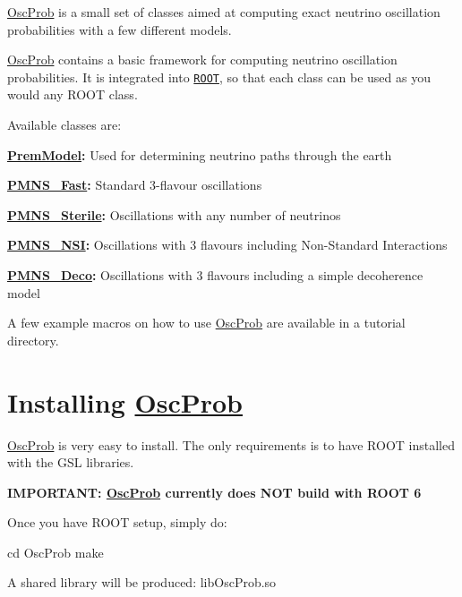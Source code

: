 \hyperlink{namespaceOscProb}{Osc\+Prob} is a small set of classes aimed at computing exact neutrino oscillation probabilities with a few different models.

\hyperlink{namespaceOscProb}{Osc\+Prob} contains a basic framework for computing neutrino oscillation probabilities. It is integrated into \href{https://root.cern.ch/}{\tt R\+O\+OT}, so that each class can be used as you would any R\+O\+OT class.

Available classes are\+:
\begin{DoxyItemize}
\item {\bfseries \hyperlink{classOscProb_1_1PremModel}{Prem\+Model}\+:} Used for determining neutrino paths through the earth
\item {\bfseries \hyperlink{classOscProb_1_1PMNS__Fast}{P\+M\+N\+S\+\_\+\+Fast}\+:} Standard 3-\/flavour oscillations
\item {\bfseries \hyperlink{classOscProb_1_1PMNS__Sterile}{P\+M\+N\+S\+\_\+\+Sterile}\+:} Oscillations with any number of neutrinos
\item {\bfseries \hyperlink{classOscProb_1_1PMNS__NSI}{P\+M\+N\+S\+\_\+\+N\+SI}\+:} Oscillations with 3 flavours including Non-\/\+Standard Interactions
\item {\bfseries \hyperlink{classOscProb_1_1PMNS__Deco}{P\+M\+N\+S\+\_\+\+Deco}\+:} Oscillations with 3 flavours including a simple decoherence model
\end{DoxyItemize}

A few example macros on how to use \hyperlink{namespaceOscProb}{Osc\+Prob} are available in a tutorial directory.

\section*{Installing \hyperlink{namespaceOscProb}{Osc\+Prob}}

\hyperlink{namespaceOscProb}{Osc\+Prob} is very easy to install. The only requirements is to have R\+O\+OT installed with the G\+SL libraries.

{\bfseries I\+M\+P\+O\+R\+T\+A\+NT\+: \hyperlink{namespaceOscProb}{Osc\+Prob} currently does N\+OT build with R\+O\+OT 6}

Once you have R\+O\+OT setup, simply do\+: 
\begin{DoxyCode}
cd OscProb
make
\end{DoxyCode}


A shared library will be produced\+: {\ttfamily lib\+Osc\+Prob.\+so}

